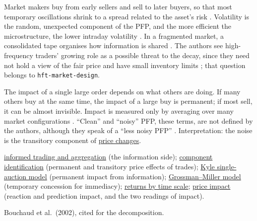 \begin{qfdefinition}
 Market makers buy from early sellers and sell to later buyers, so that most temporary oscillations shrink to a spread related to the asset's risk \citep[Introduction, pp.~3--4]{alpha-laruelle}. Volatility is the random, unexpected component of the PFP, and the more efficient the microstructure, the lower intraday volatility \citep[chap.~2, sec.~2.5.1, pp.~171--172]{alpha-laruelle}. In a fragmented market, a consolidated tape organises how information is shared \citep[Introduction, p.~7]{alpha-laruelle}. The authors see high-frequency traders' growing role as a possible threat to the decay, since they need not hold a view of the fair price and have small inventory limits \citep[same, p.~28]{alpha-laruelle}; that question belongs to \nolinkurl{hft-market-design}.

 The impact of a single large order depends on what others are doing. If many others buy at the same time, the impact of a large buy is permanent; if most sell, it can be almost invisible. Impact is measured only by averaging over many market configurations \citep[Introduction, p.~3]{alpha-laruelle}. ``Clean'' and ``noisy'' PFP, these terms, are not defined by the authors, although they speak of a ``less noisy PFP'' \citep[chap.~2, sec.~2.5.1, p.~177]{alpha-laruelle}. Interpretation: the noise is the transitory component of \hyperref[def:volatility-components]{price changes}.

 \hyperref[res:informed-trading-aggregation]{informed trading and aggregation} (the information side); \hyperref[res:spread-component-identification]{component identification} (permanent and transitory price effects of trades); \hyperref[mod:kyle-single-auction]{Kyle single-auction model} (permanent impact from information); \hyperref[mod:grossman-miller]{Grossman--Miller model} (temporary concession for immediacy); \hyperref[def:intraday-overnight-returns]{returns by time scale}; \hyperref[def:price-impact]{price impact} (reaction and prediction impact, and the two readings of impact).

 Bouchaud et al.\ (2002), cited for the decomposition.

\end{qfdefinition}
